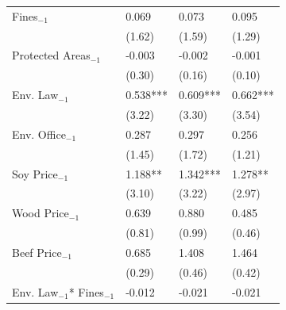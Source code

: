 \begin{table}[htpb!]
\begin{tabularx}{\columnwidth}{l XXX}
    Fines$_{-1}$ & 	0.069	&	0.073	&	0.095		\\
                    & 	(1.62)	&	(1.59)	&	(1.29)		\\
    Protected Areas$_{-1}$ & -0.003	&	-0.002	&	-0.001	\\
                    & 		(0.30)	&	(0.16)	&	(0.10)		\\
    Env. Law$_{-1}$ & 0.538***	&	0.609***	&	0.662***	\\
                    & 		(3.22)	&	(3.30)	&	(3.54)		\\
    Env. Office$_{-1}$ & 	0.287	&	0.297	&	0.256	\\
                    & 	(1.45)	&	(1.72)	&	(1.21)	\\
    Soy Price$_{-1}$ & 	1.188**	&	1.342***	&	1.278**		\\
                    &  	(3.10)	&	(3.22)	&	(2.97)		\\
    Wood Price$_{-1}$ & 	0.639	&	0.880	&	0.485		\\
                    & 	(0.81)	&	(0.99)	&	(0.46)	\\
    Beef Price$_{-1}$ & 	0.685	&	1.408	&	1.464	\\
                    & 	(0.29)	&	(0.46)	&	(0.42)		\\
    Env. Law$_{-1}$* Fines$_{-1}$ &	-0.012	&	-0.021	&	-0.021	\\

\end{tabularx}
\end{table}
